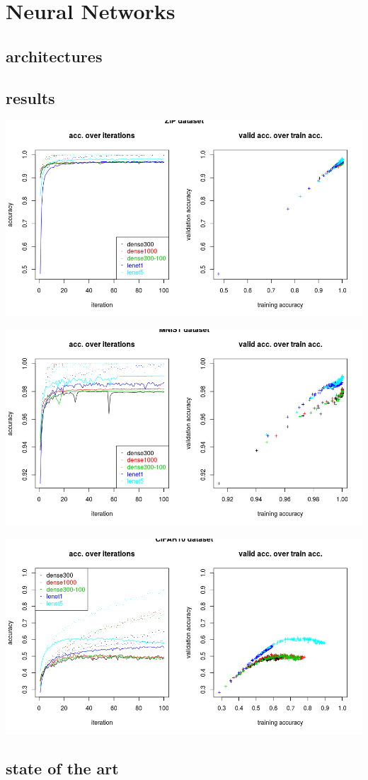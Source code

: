 
\section{Neural Networks}

\subsection{architectures}

\subsection{results}

\includegraphics[width=\textwidth]{../plots/nn_zip}

\includegraphics[width=\textwidth]{../plots/nn_mnist}

\includegraphics[width=\textwidth]{../plots/nn_cifar10}

\subsection{state of the art}
